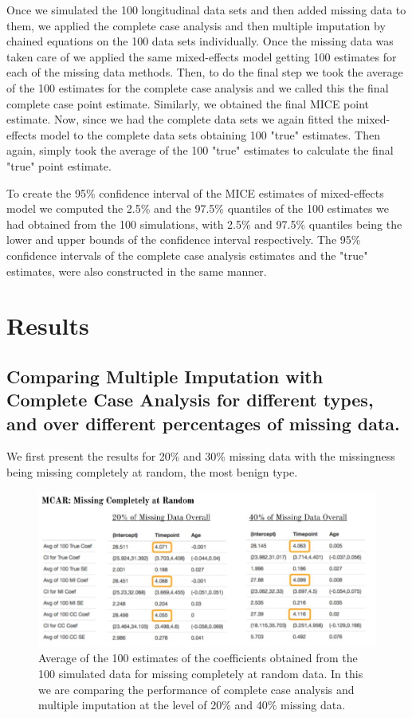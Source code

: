 \documentclass[fleqn,10pt]{wlscirep}\usepackage[]{graphicx}\usepackage[]{color}
\begin{document}
Once we simulated the 100 longitudinal data sets and then added missing data to them, we applied the complete case analysis and then multiple imputation by chained equations on the 100 data sets individually. Once the missing data was taken care of we applied the same mixed-effects model getting 100 estimates for each of the missing data methods. Then, to do the final step we took the average of the 100 estimates for the complete case analysis and we called this the final complete case point estimate. Similarly, we obtained the final MICE point estimate. Now, since we had the complete data sets we again fitted the mixed-effects model to the complete data sets obtaining 100 "true" estimates. Then again, simply took the average of the 100 "true" estimates to calculate the final "true" point estimate.  

To create the 95\% confidence interval of the MICE estimates of mixed-effects model we computed the 2.5\% and the 97.5\% quantiles of the 100 estimates we had obtained from the 100 simulations, with 2.5\% and 97.5\% quantiles being the lower and upper bounds of the confidence interval respectively. The 95\% confidence intervals of the complete case analysis estimates and the "true" estimates, were also constructed in the same manner. 

\section{Results}

\subsection{Comparing Multiple Imputation with Complete Case Analysis for different types, and over different percentages of missing data.}

We first present the results for 20\% and 30\% missing data with the missingness being missing completely at random, the most benign type. 

\begin{figure}[ht]
\centering
\includegraphics[width=\linewidth]{mcar_res_table}
\caption{Average of the 100 estimates of the coefficients obtained from the 100 simulated data for missing completely at random data. In this we are comparing the performance of complete case analysis and multiple imputation at the level of 20\% and 40\% missing data.}
\label{fig:mcar_res_table}
\end{figure}
\end{document}
